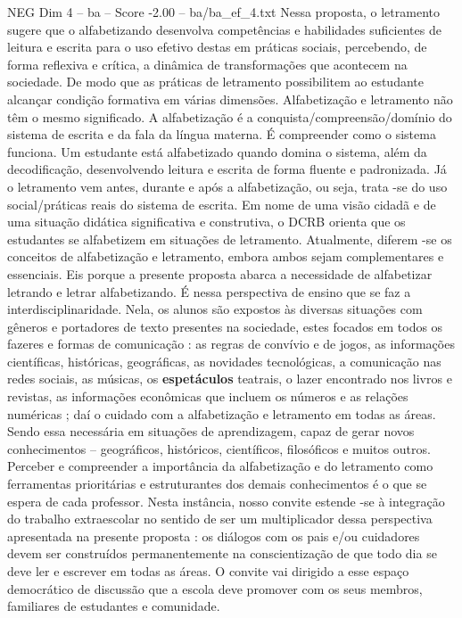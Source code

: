 \begin{textsample}{NEG Dim 4 – ba – Score -2.00 – ba/ba\_ef\_4.txt}
Nessa proposta, o letramento sugere que o alfabetizando desenvolva competências e habilidades suficientes de leitura e escrita para o uso efetivo destas em práticas sociais, percebendo, de forma reflexiva e crítica, a dinâmica de transformações que acontecem na sociedade.
De modo que as práticas de letramento possibilitem ao estudante alcançar condição formativa em várias dimensões.
Alfabetização e letramento não têm o mesmo significado.
A alfabetização é a conquista/compreensão/domínio do sistema de escrita e da fala da língua materna.
É compreender como o sistema funciona.
Um estudante está alfabetizado quando domina o sistema, além da decodificação, desenvolvendo leitura e escrita de forma fluente e padronizada.
Já o letramento vem antes, durante e após a alfabetização, ou seja, trata -se do uso social/práticas reais do sistema de escrita.
Em nome de uma visão cidadã e de uma situação didática significativa e construtiva, o DCRB orienta que os estudantes se alfabetizem em situações de letramento.
Atualmente, diferem -se os conceitos de alfabetização e letramento, embora ambos sejam complementares e essenciais.
Eis porque a presente proposta abarca a necessidade de alfabetizar letrando e letrar alfabetizando.
É nessa perspectiva de ensino que se faz a interdisciplinaridade.
Nela, os alunos são expostos às diversas situações com gêneros e portadores de texto presentes na sociedade, estes focados em todos os fazeres e formas de comunicação : as regras de convívio e de jogos, as informações científicas, históricas, geográficas, as novidades tecnológicas, a comunicação nas redes sociais, as músicas, os \textbf{espetáculos} teatrais, o lazer encontrado nos livros e revistas, as informações econômicas que incluem os números e as relações numéricas ; daí o cuidado com a alfabetização e letramento em todas as áreas.
Sendo essa necessária em situações de aprendizagem, capaz de gerar novos conhecimentos – geográficos, históricos, científicos, filosóficos e muitos outros.
Perceber e compreender a importância da alfabetização e do letramento como ferramentas prioritárias e estruturantes dos demais conhecimentos é o que se espera de cada professor.
Nesta instância, nosso convite estende -se à integração do trabalho extraescolar no sentido de ser um multiplicador dessa perspectiva apresentada na presente proposta : os diálogos com os pais e/ou cuidadores devem ser construídos permanentemente na conscientização de que todo dia se deve ler e escrever em todas as áreas.
O convite vai dirigido a esse espaço democrático de discussão que a escola deve promover com os seus membros, familiares de estudantes e comunidade.

\end{textsample}
